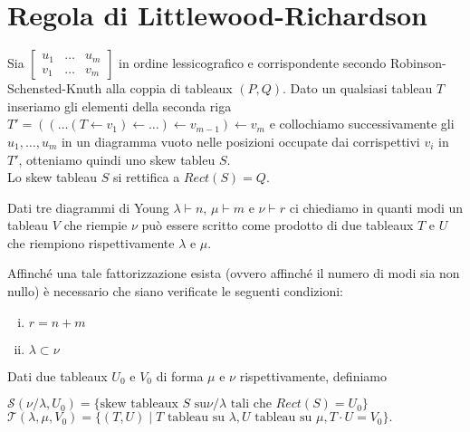 \chapter{Regola di Littlewood-Richardson}

\begin{prop}
Sia
\begin{math}
\begin{bmatrix}
u_1 & \ldots & u_m\\
v_1 & \ldots & v_m
\end{bmatrix}
\end{math}
in ordine lessicografico e corrispondente secondo
Robinson-Schensted-Knuth alla coppia di tableaux $(P,Q)$. Dato un
qualsiasi tableau $T$ inseriamo gli elementi della seconda riga
$T' = ((\ldots (T \gets v_1) \gets \ldots ) \gets v_{m-1} ) \gets v_m$ e
collochiamo successivamente gli $u_1, \ldots, u_m$ in un diagramma
vuoto nelle posizioni occupate dai corrispettivi $v_i$ in $T'$,
otteniamo quindi uno skew tableu $S$.\\
Lo skew tableau $S$ si rettifica a $Rect(S)=Q$.
\end{prop}

Dati tre diagrammi di Young $\lambda \vdash n$, $\mu \vdash m$ e $\nu
\vdash r$ ci chiediamo in quanti modi un tableau $V$ che riempie
$\nu$ pu\`o essere scritto come prodotto di due tableaux $T$ e $U$
che riempiono rispettivamente $\lambda$ e $\mu$.

\begin{oss}
Affinch\'e una tale fattorizzazione esista (ovvero affinch\'e il numero
di modi sia non nullo) \`e necessario che siano verificate le seguenti
condizioni:
\begin{enumerate}[(i)]
\item $r = n + m$
\item $\lambda \subset \nu$
\end{enumerate}
\end{oss}

\begin{defn}
Dati due tableaux $U_0$ e $V_0$ di forma $\mu$ e $\nu$
rispettivamente, definiamo
\begin{center}\begin{math}
\mathcal{S}(\nu/\lambda, U_0) = \{\text{skew tableaux } S \text{ su
}\nu/\lambda \text{ tali che } Rect(S) =U_0\}
\end{math}\\
\begin{math}
\mathcal{T}(\lambda, \mu, V_0)=\{(T,U) \mid T \text{ tableau su }
\lambda, U \text{ tableau su } \mu, T\cdot U=V_0\}.
\end{math}\end{center}
\end{defn}

